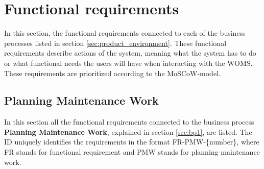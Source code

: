 \section{Functional requirements}
\label{sec:functional_requirements}

In this section, the functional requirements connected to each of the business processes listed in section \ref{sec:product_environment}. These functional requirements describe actions of the system, meaning what the system has to do or what functional needs the users will have when interacting with the WOMS. These requirements are prioritized according to the MoSCoW-model. 

\subsection{Planning Maintenance Work}
\label{sub:planning_maintenance_work}
In this section all the functional requirements connected to the business process \textbf{Planning Maintenance Work}, explained in section \ref{sec:bp1}, are listed. The ID uniquely identifies the requirements in the format FR-PMW-\{number\}, where  FR stands for functional requirement and PMW stands for planning maintenance work. 

